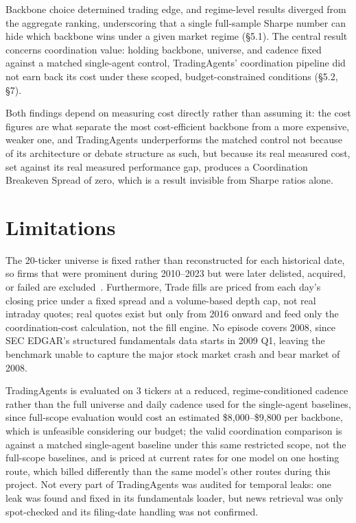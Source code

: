 \documentclass{article}
\begin{document}
Backbone choice determined trading edge, and regime-level results diverged from the aggregate ranking, underscoring that a single full-sample Sharpe number can hide which backbone wins under a given market regime (\S5.1). The central result concerns coordination value: holding backbone, universe, and cadence fixed against a matched single-agent control, TradingAgents' coordination pipeline did not earn back its cost under these scoped, budget-constrained conditions (\S5.2, \S7).

Both findings depend on measuring cost directly rather than assuming it: the cost figures are what separate the most cost-efficient backbone from a more expensive, weaker one, and TradingAgents underperforms the matched control not because of its architecture or debate structure as such, but because its real measured cost, set against its real measured performance gap, produces a Coordination Breakeven Spread of zero, which is a result invisible from Sharpe ratios alone.

\section{Limitations}

The 20-ticker universe is fixed rather than reconstructed for each historical date, so firms that were prominent during 2010--2023 but were later delisted, acquired, or failed are excluded~\cite{brown1992}. Furthermore, Trade fills are priced from each day's closing price under a fixed spread and a volume-based depth cap, not real intraday quotes; real quotes exist but only from 2016 onward and feed only the coordination-cost calculation, not the fill engine. No episode covers 2008, since SEC EDGAR's structured fundamentals data starts in 2009 Q1, leaving the benchmark unable to capture the major stock market crash and bear market of 2008.

TradingAgents is evaluated on 3 tickers at a reduced, regime-conditioned cadence rather than the full universe and daily cadence used for the single-agent baselines, since full-scope evaluation would cost an estimated \$8{,}000--\$9{,}800 per backbone, which is unfeasible considering our budget; the valid coordination comparison is against a matched single-agent baseline under this same restricted scope, not the full-scope baselines, and is priced at current rates for one model on one hosting route, which billed differently than the same model's other routes during this project. Not every part of TradingAgents was audited for temporal leaks: one leak was found and fixed in its fundamentals loader, but news retrieval was only spot-checked and its filing-date handling was not confirmed.
\end{document}
